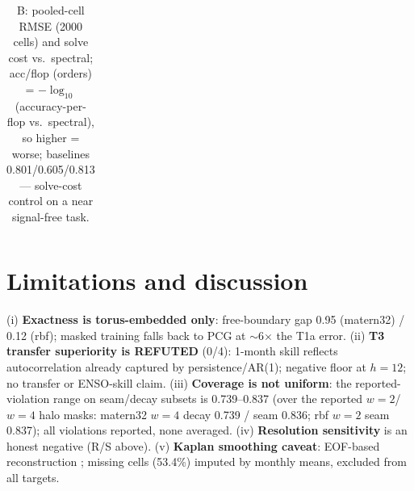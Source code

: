\documentclass{article}
\begin{document}
\begin{table}[ht]
\begin{minipage}[t]{0.47\linewidth}
\begin{tabular}{lcccc}
\bottomrule
\end{tabular}
\caption{T3 start-month $\times$ lead skill vs.\ climatology ($n{=}7$
per origin); at $h{=}12$ every origin is at or below the climatology floor
except April (+0.059).}
\label{tab:t3months}
\end{minipage}\hfill
\begin{minipage}[t]{0.47\linewidth}
\centering
{}
\caption{B: pooled-cell RMSE (2000 cells) and solve cost vs.\ spectral;
acc/flop (orders) = $-{\log_{10}}$(accuracy-per-flop vs.\ spectral), so
higher = worse; baselines 0.801/0.605/0.813 --- solve-cost control on a
near signal-free task.}
\label{tab:ratio}
\end{minipage}
\end{table}

\section{Limitations and discussion}
\label{sec:limits}
(i) \textbf{Exactness is torus-embedded only}: free-boundary gap 0.95
(matern32) / 0.12 (rbf); masked
training falls back to PCG at $\sim$6$\times$ the T1a error. (ii)
\textbf{T3 transfer superiority is REFUTED} (0/4): 1-month skill reflects
autocorrelation already captured by persistence/AR(1); negative floor at
$h{=}12$; no transfer or ENSO-skill claim. (iii) \textbf{Coverage
is not uniform}: the reported-violation range on seam/decay subsets is
0.739--0.837 (over the reported $w{=}2$/$w{=}4$ halo masks: matern32
$w{=}4$ decay 0.739 / seam 0.836; rbf $w{=}2$ seam 0.837); all
violations reported, none averaged. (iv)
\textbf{Resolution sensitivity} is an honest negative (R/S above). (v)
\textbf{Kaplan smoothing caveat}: EOF-based reconstruction
\cite{kaplan1998analyses}; missing cells (53.4\%) imputed by monthly means,
excluded from all targets.
\end{document}
